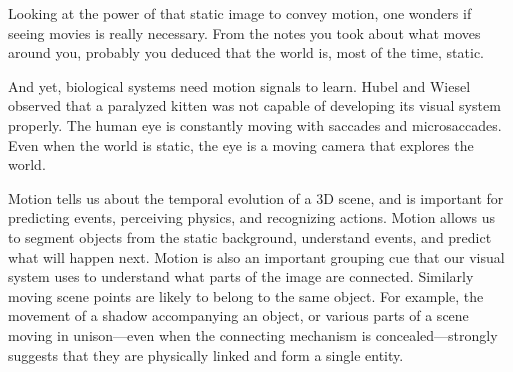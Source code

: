 Looking at the power of that static image to convey motion, one wonders if seeing movies is really necessary. From the notes you took about what moves around you, probably you deduced that the world is, most of the time, static. 

And yet, biological systems need motion signals to learn. Hubel and Wiesel \cite{Wiesel1981} observed that a paralyzed kitten was not capable of developing its visual system properly. The human eye is constantly moving with saccades and microsaccades. Even when the world is static, the eye is a moving camera that explores the world. 










Motion tells us about the temporal evolution of a 3D scene, and is important for predicting events, perceiving physics, and recognizing actions. 
Motion allows us to segment objects from the static background, understand events, and predict what will happen next.  Motion is also an important grouping cue that our visual system uses to understand what parts of the image are connected. Similarly moving scene points are likely to belong to the same object. For example, the movement of a shadow accompanying an object, or various parts of a scene moving in unison—even when the connecting mechanism is concealed—strongly suggests that they are physically linked and form a single entity.





